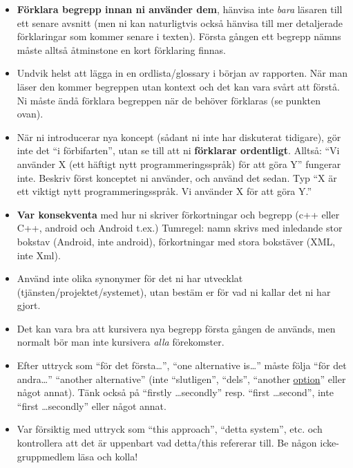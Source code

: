\begin{itemize}
\label{app:definiera-innan-anv}
\item    \textbf{Förklara begrepp innan ni använder dem}, hänvisa inte \emph{bara} läsaren till ett senare avsnitt (men ni kan naturligtvis också hänvisa till mer detaljerade förklaringar som kommer senare i texten).  Första gången ett begrepp nämns måste alltså åt\-min\-sto\-ne en kort förklaring finnas.

\item Undvik helst att lägga in en ordlista/glossary i början av rapporten. När man läser den kommer begreppen utan kontext och det kan vara svårt att förstå. Ni måste ändå förklara begreppen när de behöver förklaras (se punkten ovan).

\item    När ni introducerar nya koncept (sådant ni inte har diskuterat tidigare), gör inte det ``i förbifarten'', utan se till att ni \textbf{förklarar ordentligt}.  Alltså: ``Vi använder X (ett häftigt nytt programmeringsspråk) för att göra Y'' fungerar inte.  Beskriv först konceptet ni använder, och använd det sedan.  Typ ``X är ett viktigt nytt programmeringsspråk.  Vi använder X för att göra Y.''

\item    \textbf{Var konsekventa} med hur ni skriver förkortningar och begrepp (c++ eller C++, android och Android t.ex.) Tumregel: namn skrivs med inledande stor bokstav (Android, inte android), förkortningar med stora bokstäver (XML, inte Xml).

\item    Använd inte olika synonymer för det ni har utvecklat (tjänsten/projektet/systemet), utan bestäm er för vad ni kallar det ni har gjort.

\item    Det kan vara bra att kursivera nya begrepp första gången de används, men normalt bör man inte kursivera \emph{alla} förekomster.

\item    Efter uttryck som ``för det första\ldots'', ``one alternative is\ldots'' måste följa ``för det andra\ldots'' ``another alternative'' (inte ``slutligen'', ``dels'', ``another \underline{option}'' eller något annat).  Tänk också på ``firstly \ldots secondly'' resp. ``first \ldots second'', inte ``first \ldots secondly'' eller något annat.

\item    Var försiktig med uttryck som ``this approach'', ``detta system'', etc. och kontrollera att det är uppenbart vad detta/this refererar till. Be någon icke-gruppmedlem läsa och kolla!


\end{itemize}
